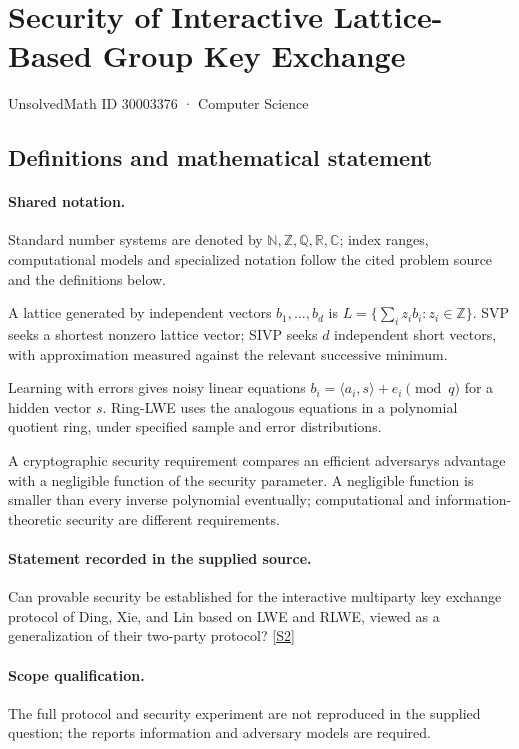 \documentclass[11pt]{article}
\newcommand{\sref}[2]{\hyperlink{source:#1:#2}{[S#2]}}
\begin{document}
\setcounter{section}{30003375}
\section{Security of Interactive Lattice-Based Group Key Exchange}\label{30003376}
{\small\sffamily UnsolvedMath ID 30003376 · Computer Science}
\subsection{Definitions and mathematical statement}

\paragraph{Shared notation.}Standard number systems are denoted by $\mathbb N,\mathbb Z,\mathbb Q,\mathbb R,\mathbb C$; index ranges, computational models and specialized notation follow the cited problem source and the definitions below.


A lattice generated by independent vectors $b_1,\ldots,b_d$ is $L=\{\sum_i z_i b_i:z_i\in\mathbb Z\}$. SVP seeks a shortest nonzero lattice vector; SIVP seeks $d$ independent short vectors, with approximation measured against the relevant successive minimum.

Learning with errors gives noisy linear equations $b_i=\langle a_i,s\rangle+e_i\pmod q$ for a hidden vector $s$. Ring-LWE uses the analogous equations in a polynomial quotient ring, under specified sample and error distributions.

A cryptographic security requirement compares an efficient adversary\textquotesingle s advantage with a negligible function of the security parameter. A negligible function is smaller than every inverse polynomial eventually; computational and information-theoretic security are different requirements.
\paragraph{Statement recorded in the supplied source.}
Can provable security be established for the interactive multiparty key exchange protocol of Ding, Xie, and Lin based on LWE and RLWE, viewed as a generalization of their two-party protocol? \sref{30003376}{2}
\paragraph{Scope qualification.}
The full protocol and security experiment are not reproduced in the supplied question; the report\textquotesingle s information and adversary models are required.
\end{document}
